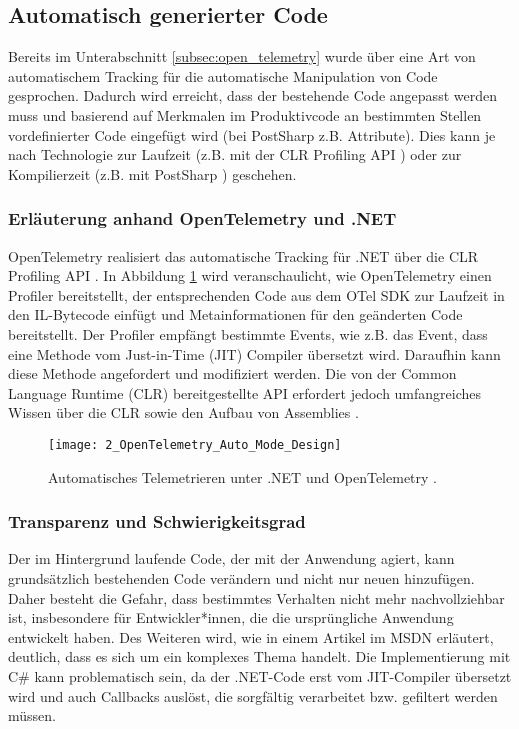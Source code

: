 \subsection{Automatisch generierter Code}
\label{subsec:autogenerated_code}
Bereits im Unterabschnitt \ref{subsec:open_telemetry} wurde über eine Art von automatischem Tracking für die automatische Manipulation von Code gesprochen. Dadurch wird erreicht, dass der bestehende Code angepasst werden muss und basierend auf Merkmalen im Produktivcode an bestimmten Stellen vordefinierter Code eingefügt wird (bei PostSharp z.B. Attribute). Dies kann je nach Technologie zur Laufzeit (z.B. mit der CLR Profiling API \cite{microsoft2025profiling}) oder zur Kompilierzeit (z.B. mit PostSharp \cite{postsharp-how-it-works}) geschehen.

\subsubsection{Erläuterung anhand OpenTelemetry und .NET}
OpenTelemetry realisiert das automatische Tracking für .NET über die CLR Profiling API \cite{microsoft2025profiling}. In Abbildung \ref{fig:opentelemetry_design} wird veranschaulicht, wie OpenTelemetry einen Profiler bereitstellt, der entsprechenden Code aus dem OTel SDK zur Laufzeit in den IL-Bytecode einfügt und Metainformationen für den geänderten Code bereitstellt. Der Profiler empfängt bestimmte Events, wie z.B. das Event, dass eine Methode vom Just-in-Time (JIT) Compiler übersetzt wird. Daraufhin kann diese Methode angefordert und modifiziert werden. Die von der Common Language Runtime (CLR) bereitgestellte API erfordert jedoch umfangreiches Wissen über die CLR sowie den Aufbau von Assemblies \cite{Mikunov2003}.

\begin{figure}[H]
\centering
\texttt{[image: 2\_OpenTelemetry\_Auto\_Mode\_Design]}
\caption{Automatisches Telemetrieren unter .NET und OpenTelemetry \cite{otel-dotnet-instrumentation-design}.}
\label{fig:opentelemetry_design}
\end{figure}

\subsubsection{Transparenz und Schwierigkeitsgrad}
Der im Hintergrund laufende Code, der mit der Anwendung agiert, kann grundsätzlich bestehenden Code verändern und nicht nur neuen hinzufügen. Daher besteht die Gefahr, dass bestimmtes Verhalten nicht mehr nachvollziehbar ist, insbesondere für Entwickler*innen, die die ursprüngliche Anwendung entwickelt haben. Des Weiteren wird, wie in einem Artikel \cite{Mikunov2003} im MSDN erläutert, deutlich, dass es sich um ein komplexes Thema handelt. Die Implementierung mit C\# kann problematisch sein, da der .NET-Code erst vom JIT-Compiler übersetzt wird und auch Callbacks auslöst, die sorgfältig verarbeitet bzw. gefiltert werden müssen.

